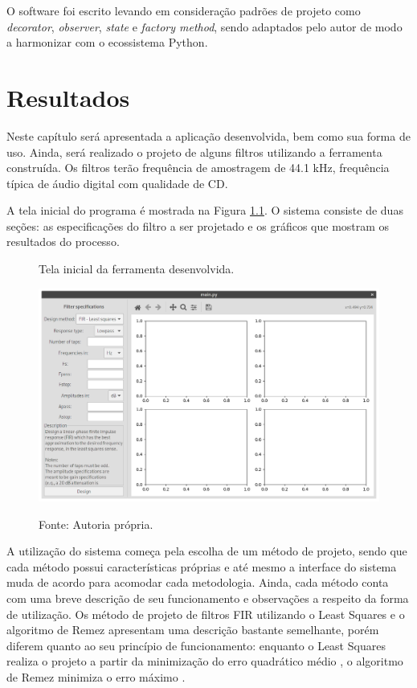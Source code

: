 \documentclass[12pt,a4paper]{report}
\begin{document}
  O software foi escrito levando em consideração padrões de projeto \cite{gang_of_four} como \textit{decorator},
  \textit{observer}, \textit{state} e \textit{factory method}, sendo adaptados pelo autor de modo a harmonizar
  com o ecossistema Python.

\chapter{Resultados}
  Neste capítulo será apresentada a aplicação desenvolvida, bem como sua forma de uso. Ainda, será realizado o
  projeto de alguns filtros utilizando a ferramenta construída. Os filtros terão frequência de amostragem de
  44.1 kHz, frequência típica de áudio digital com qualidade de CD.

  A tela inicial do programa é mostrada na Figura \ref{fig:home}. O sistema consiste de duas seções: as
  especificações do filtro a ser projetado e os gráficos que mostram os resultados do processo.
  \begin{figure}[H]
    \caption{Tela inicial da ferramenta desenvolvida.}
    \centering
    \includegraphics[width=\textwidth]{images/home}
    \label{fig:home}
    \caption*{Fonte: Autoria própria.}
  \end{figure}

  A utilização do sistema começa pela escolha de um método de projeto, sendo que cada método possui
  características próprias e até mesmo a interface do sistema muda de acordo para acomodar cada metodologia.
  Ainda, cada método conta com uma breve descrição de seu funcionamento e observações a respeito da forma de
  utilização. Os método de projeto de filtros FIR utilizando o Least Squares e o algoritmo de Remez apresentam
  uma descrição bastante semelhante, porém diferem quanto ao seu princípio de funcionamento: enquanto o Least
  Squares realiza o projeto a partir da minimização do erro quadrático médio \cite{selesnick}, o algoritmo de
  Remez minimiza o erro máximo \cite{mcclellan_parks}.
\end{document}
